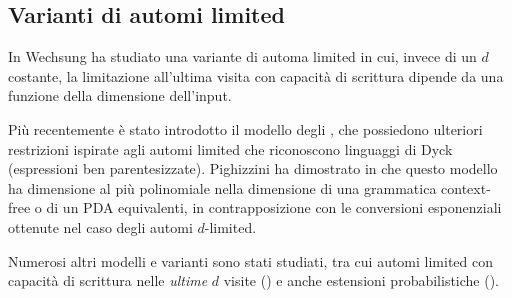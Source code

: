 \subsection{Varianti di automi limited}
In \cite{Wechsung:79:complexities} Wechsung ha studiato una variante di automa limited in cui, invece di un $d$ costante, la limitazione all'ultima visita con capacità di scrittura dipende da una funzione della dimensione dell'input.

Più recentemente è stato introdotto il modello degli , che possiedono ulteriori restrizioni ispirate agli automi limited che riconoscono linguaggi di Dyck (espressioni ben parentesizzate). Pighizzini ha dimostrato in \cite{Pighizzini:16:stronglylimited} che questo modello ha dimensione al più polinomiale nella dimensione di una grammatica context-free o di un PDA equivalenti, in contrapposizione con le conversioni esponenziali ottenute nel caso degli automi $d$-limited.

Numerosi altri modelli e varianti sono stati studiati, tra cui automi limited con capacità di scrittura nelle \emph{ultime} $d$ visite (\cite{Wechsung:79:complexities}) e anche estensioni probabilistiche (\cite{Yamakami:19:limitedmodels}).
